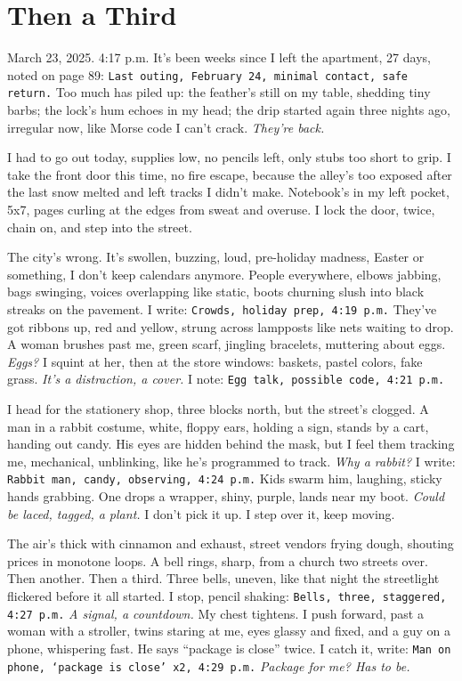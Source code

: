 \documentclass[12pt]{article}
\newcommand{\note}[1]{\texttt{#1}}
\begin{document}
\section{Then a Third}

March 23, 2025. 4:17 p.m. It’s been weeks since I left the apartment, 27 days, noted on page 89: \note{Last outing, February 24, minimal contact, safe return.} Too much has piled up: the feather’s still on my table, shedding tiny barbs; the lock’s hum echoes in my head; the drip started again three nights ago, irregular now, like Morse code I can’t crack. \textit{They’re back.}

I had to go out today, supplies low, no pencils left, only stubs too short to grip. I take the front door this time, no fire escape, because the alley’s too exposed after the last snow melted and left tracks I didn’t make. Notebook’s in my left pocket, 5x7, pages curling at the edges from sweat and overuse. I lock the door, twice, chain on, and step into the street.

The city’s wrong. It’s swollen, buzzing, loud, pre-holiday madness, Easter or something, I don’t keep calendars anymore. People everywhere, elbows jabbing, bags swinging, voices overlapping like static, boots churning slush into black streaks on the pavement. I write: \note{Crowds, holiday prep, 4:19 p.m.} They’ve got ribbons up, red and yellow, strung across lampposts like nets waiting to drop. A woman brushes past me, green scarf, jingling bracelets, muttering about eggs. \textit{Eggs?} I squint at her, then at the store windows: baskets, pastel colors, fake grass. \textit{It’s a distraction, a cover.} I note: \note{Egg talk, possible code, 4:21 p.m.}

I head for the stationery shop, three blocks north, but the street’s clogged. A man in a rabbit costume, white, floppy ears, holding a sign, stands by a cart, handing out candy. His eyes are hidden behind the mask, but I feel them tracking me, mechanical, unblinking, like he’s programmed to track. \textit{Why a rabbit?} I write: \note{Rabbit man, candy, observing, 4:24 p.m.} Kids swarm him, laughing, sticky hands grabbing. One drops a wrapper, shiny, purple, lands near my boot. \textit{Could be laced, tagged, a plant.} I don’t pick it up. I step over it, keep moving.

The air’s thick with cinnamon and exhaust, street vendors frying dough, shouting prices in monotone loops. A bell rings, sharp, from a church two streets over. Then another. Then a third. Three bells, uneven, like that night the streetlight flickered before it all started. I stop, pencil shaking: \note{Bells, three, staggered, 4:27 p.m.} \textit{A signal, a countdown.} My chest tightens. I push forward, past a woman with a stroller, twins staring at me, eyes glassy and fixed, and a guy on a phone, whispering fast. He says “package is close” twice. I catch it, write: \note{Man on phone, ‘package is close’ x2, 4:29 p.m.} \textit{Package for me? Has to be.}
\end{document}
